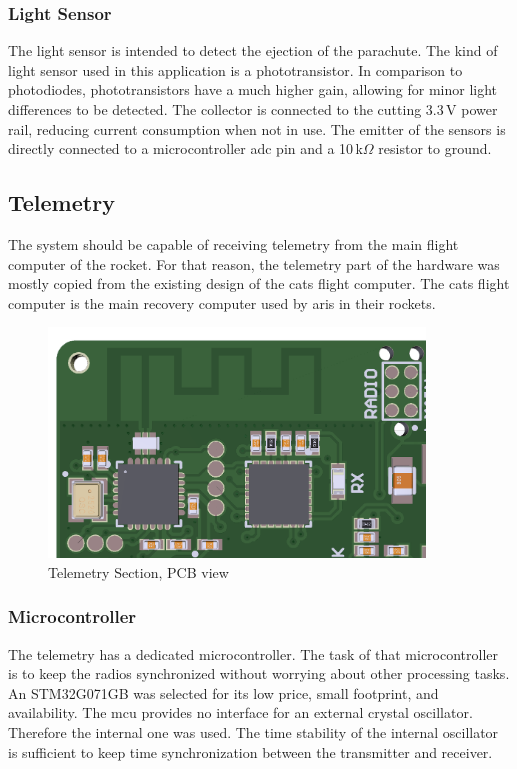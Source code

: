 \subsubsection{Light Sensor}
The light sensor is intended to detect the ejection of the parachute. The kind of light sensor used in this application is a phototransistor. In comparison to photodiodes, phototransistors have a much higher gain, allowing for minor light differences to be detected. The collector is connected to the cutting 3.3\,V power rail, reducing current consumption when not in use. The emitter of the sensors is directly connected to a microcontroller \acrshort{adc} pin and a 10\,k$\Omega$ resistor to ground.


\subsection{Telemetry}
The system should be capable of receiving telemetry from the main flight computer of the rocket. For that reason, the telemetry part of the hardware was mostly copied from the existing design of the \gls{cats} flight computer. The \gls{cats} flight computer is the main recovery computer used by \acrshort{aris} in their rockets. 

\begin{figure}[h!]
	\centering
	\includegraphics[width=10cm]{images/antenna}
	\caption{Telemetry Section, PCB view}
	\label{fig:antenna}
\end{figure}

\subsubsection{Microcontroller}
The telemetry has a dedicated microcontroller. The task of that microcontroller is to keep the radios synchronized without worrying about other processing tasks. An STM32G071GB was selected for its low price, small footprint, and availability. The \acrshort{mcu} provides no interface for an external crystal oscillator. Therefore the internal one was used. The time stability of the internal oscillator is sufficient to keep time synchronization between the transmitter and receiver.


